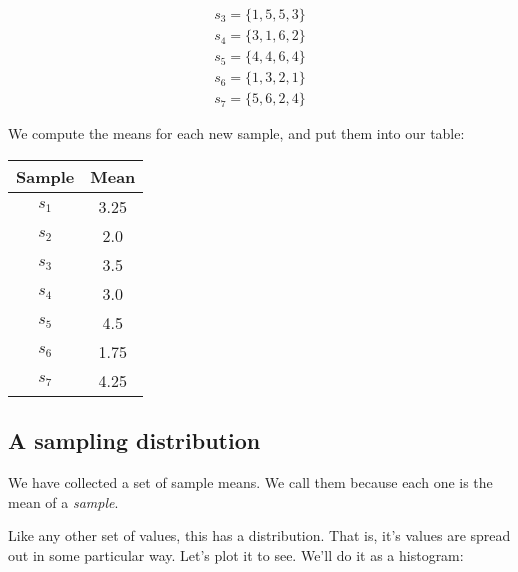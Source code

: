\documentclass[../../../main.tex]{subfiles}
\begin{document}
\begin{multline*}
  s_{3} = \{ 1, 5, 5, 3 \} \\
  s_{4} = \{ 3, 1, 6, 2 \} \\
  s_{5} = \{ 4, 4, 6, 4 \} \\
  s_{6} = \{ 1, 3, 2, 1 \} \\
  s_{7} = \{ 5, 6, 2, 4 \}  
\end{multline*}

\noindent
We compute the means for each new sample, and put them into our table:

\begin{center}
  \begin{tabular}{| c | c |}
    \hline
    \textbf{Sample} & \textbf{Mean} \\ \hline
    $s_{1}$ & 3.25 \\ \hline
    $s_{2}$ & 2.0 \\ \hline
    $s_{3}$ & 3.5 \\ \hline
    $s_{4}$ & 3.0 \\ \hline
    $s_{5}$ & 4.5 \\ \hline
    $s_{6}$ & 1.75 \\ \hline
    $s_{7}$ & 4.25 \\ \hline
  \end{tabular}
\end{center}


\subsection{A sampling distribution}

We have collected a set of sample means. We call them  because each one is the mean of a \emph{sample}.

Like any other set of values, this has a distribution. That is, it's values are spread out in some particular way. Let's plot it to see. We'll do it as a histogram:

\begin{center}
\end{center}
\end{document}
